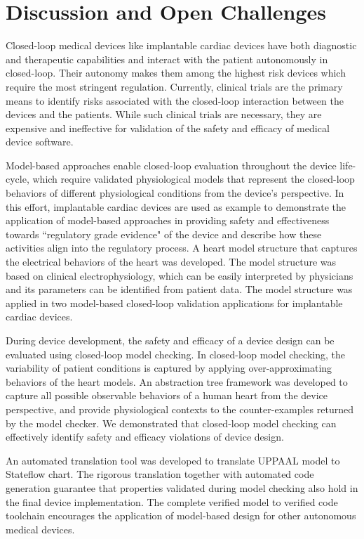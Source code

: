 \chapter{Discussion and Open Challenges}
Closed-loop medical devices like implantable cardiac devices have both diagnostic and therapeutic capabilities and interact with the patient autonomously in closed-loop. 
Their autonomy makes them among the highest risk devices which require the most stringent regulation. 
Currently, clinical trials are the primary means to identify risks associated with the closed-loop interaction between the devices and the patients. 
While such clinical trials are necessary, they are expensive and ineffective for validation of the safety and efficacy of medical device software. 

Model-based approaches enable closed-loop evaluation throughout the device life-cycle, which require validated physiological models that represent the closed-loop behaviors of different physiological conditions from the device's perspective. 
In this effort, implantable cardiac devices are used as example to demonstrate the application of model-based approaches in providing safety and effectiveness towards ``regulatory grade evidence" of the device and describe how these activities align into the regulatory process. 
A heart model structure that captures the electrical behaviors of the heart was developed.
The model structure was based on clinical electrophysiology, which can be easily interpreted by physicians and its parameters can be identified from patient data.
The model structure was applied in two model-based closed-loop validation applications for implantable cardiac devices.

During device development, the safety and efficacy of a device design can be evaluated using closed-loop model checking.
In closed-loop model checking, the variability of patient conditions is captured by applying over-approximating behaviors of the heart models.
An abstraction tree framework was developed to capture all possible observable behaviors of a human heart from the device perspective, and provide physiological contexts to the counter-examples returned by the model checker.
We demonstrated that closed-loop model checking can effectively identify safety and efficacy violations of device design.

An automated translation tool was developed to translate UPPAAL model to Stateflow chart. 
The rigorous translation together with automated code generation guarantee that properties validated during model checking also hold in the final device implementation.
The complete verified model to verified code toolchain encourages the application of model-based design for other autonomous medical devices.

